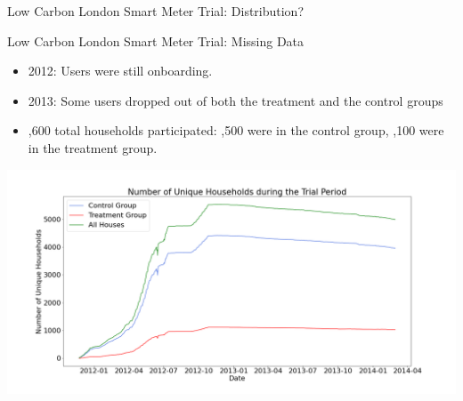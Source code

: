 \documentclass{beamer}
\begin{document}
\begin{frame}{Low Carbon London Smart Meter Trial: Distribution?}
  \begin{figure}
    \centering
    \qquad
  \end{figure}
\end{frame}

\begin{frame}{Low Carbon London Smart Meter Trial: Missing Data}
  \begin{itemize}
    \item 2012: Users were still onboarding.
    \item 2013: Some users dropped out of both the treatment and the control groups
    \item {},600 total households participated: ,500 were in the control group, ,100 were in the treatment group.
  \end{itemize}
  \vspace{-0.25cm}
  \includegraphics[width=1\textwidth]{images/house-count.png}
\end{frame}
\end{document}
